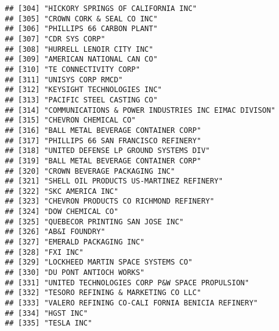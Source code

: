 \documentclass[
]{book}
\newenvironment{Shaded}{\begin{snugshade}}{\end{snugshade}}
\newcommand{\CommentTok}[1]{\textcolor[rgb]{0.56,0.35,0.01}{\textit{#1}}}
\newcommand{\KeywordTok}[1]{\textcolor[rgb]{0.13,0.29,0.53}{\textbf{#1}}}
\newcommand{\NormalTok}[1]{#1}
\newcommand{\OperatorTok}[1]{\textcolor[rgb]{0.81,0.36,0.00}{\textbf{#1}}}
\newcommand{\StringTok}[1]{\textcolor[rgb]{0.31,0.60,0.02}{#1}}
\begin{document}
\begin{verbatim}
## [304] "HICKORY SPRINGS OF CALIFORNIA INC"                       
## [305] "CROWN CORK & SEAL CO INC"                                
## [306] "PHILLIPS 66 CARBON PLANT"                                
## [307] "CDR SYS CORP"                                            
## [308] "HURRELL LENOIR CITY INC"                                 
## [309] "AMERICAN NATIONAL CAN CO"                                
## [310] "TE CONNECTIVITY CORP"                                    
## [311] "UNISYS CORP RMCD"                                        
## [312] "KEYSIGHT TECHNOLOGIES INC"                               
## [313] "PACIFIC STEEL CASTING CO"                                
## [314] "COMMUNICATIONS & POWER INDUSTRIES INC EIMAC DIVISON"     
## [315] "CHEVRON CHEMICAL CO"                                     
## [316] "BALL METAL BEVERAGE CONTAINER CORP"                      
## [317] "PHILLIPS 66 SAN FRANCISCO REFINERY"                      
## [318] "UNITED DEFENSE LP GROUND SYSTEMS DIV"                    
## [319] "BALL METAL BEVERAGE CONTAINER CORP"                      
## [320] "CROWN BEVERAGE PACKAGING INC"                            
## [321] "SHELL OIL PRODUCTS US-MARTINEZ REFINERY"                 
## [322] "SKC AMERICA INC"                                         
## [323] "CHEVRON PRODUCTS CO RICHMOND REFINERY"                   
## [324] "DOW CHEMICAL CO"                                         
## [325] "QUEBECOR PRINTING SAN JOSE INC"                          
## [326] "AB&I FOUNDRY"                                            
## [327] "EMERALD PACKAGING INC"                                   
## [328] "FXI INC"                                                 
## [329] "LOCKHEED MARTIN SPACE SYSTEMS CO"                        
## [330] "DU PONT ANTIOCH WORKS"                                   
## [331] "UNITED TECHNOLOGIES CORP P&W SPACE PROPULSION"           
## [332] "TESORO REFINING & MARKETING CO LLC"                      
## [333] "VALERO REFINING CO-CALI FORNIA BENICIA REFINERY"         
## [334] "HGST INC"                                                
## [335] "TESLA INC"
\end{verbatim}

\begin{Shaded}
\end{Shaded}
\end{document}
